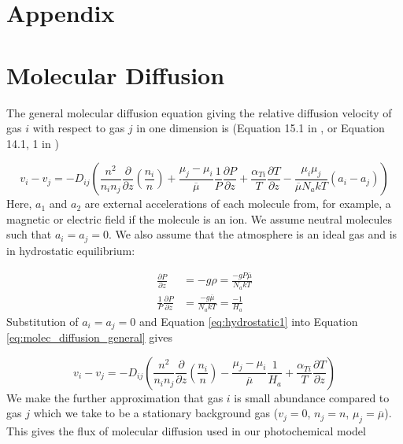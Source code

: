 \documentclass{article}
\begin{document}
\appendix
\section*{Appendix}

\section{Molecular Diffusion} \label{sec:molecular_diffusion}

The general molecular diffusion equation giving the relative diffusion velocity of gas $i$ with respect to gas $j$ in one dimension is (Equation 15.1 in \cite{Banks_2013}, or Equation 14.1, 1 in \cite{Chapman_1990})

\begin{equation} \label{eq:molec_diffusion_general}
  v_i - v_j = -D_{ij} \left( \frac{n^2}{n_i n_j} \frac{\partial}{\partial z} \left(\frac{n_i}{n}\right) + \frac{\mu_j - \mu_i}{\overline{\mu}} \frac{1}{P} \frac{\partial P}{\partial z} + \frac{\alpha_{Ti}}{T} \frac{\partial T}{\partial z} - \frac{\mu_i \mu_j}{\overline{\mu} N_a k T} (a_i - a_j)\right)
\end{equation}
Here, $a_1$ and $a_2$ are external accelerations of each molecule from, for example, a magnetic or electric field if the molecule is an ion. We assume neutral molecules such that $a_i = a_j = 0$. We also assume that the atmosphere is an ideal gas and is in hydrostatic equilibrium:

\begin{align} 
  \frac{\partial P}{\partial z} &= -g \rho = \frac{-g P \overline{\mu}}{N_a k T} \\
  \frac{1}{P}\frac{\partial P}{\partial z} &= \frac{-g \overline{\mu}}{N_a k T} = \frac{-1}{H_a} \label{eq:hydrostatic1}
\end{align}
Substitution of $a_i = a_j = 0$ and Equation \eqref{eq:hydrostatic1} into Equation \eqref{eq:molec_diffusion_general} gives

\begin{equation} \label{eq:molec_diffusion_simplify1}
  v_i - v_j = -D_{ij} \left( \frac{n^2}{n_i n_j} \frac{\partial}{\partial z} \left(\frac{n_i}{n}\right) - \frac{\mu_j - \mu_i}{\overline{\mu}} \frac{1}{H_a} + \frac{\alpha_{Ti}}{T} \frac{\partial T}{\partial z} \right)
\end{equation}
We make the further approximation that gas $i$ is small abundance compared to gas $j$ which we take to be a stationary background gas ($v_j = 0$, $n_j = n$, $\mu_j = \overline{\mu}$). This gives the flux of molecular diffusion used in our photochemical model
\end{document}
